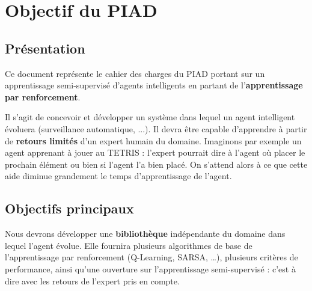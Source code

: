 \documentclass[a4paper,12pt]{article}
\begin{document}
  \begin{titlepage}
   \def\titletype{Cahier des charges}
   
  \end{titlepage}

  
  \clearpage

  \tableofcontents
  

  \clearpage
  
  \renewcommand{\labelitemi}{$\bullet$}
  \renewcommand{\labelitemii}{$\circ$}
  \renewcommand{\labelitemiii}{$\diamond$}
  \renewcommand{\labelitemiv}{$\ast$}
  
  \section{Objectif du PIAD}
  \subsection{Présentation}
    Ce document représente le cahier des charges du PIAD portant sur un apprentissage semi-supervisé d'agents intelligents 
    en partant de l'\textbf{apprentissage par renforcement}.
	  
    Il s'agit de concevoir et développer un système dans lequel un agent intelligent évoluera (surveillance automatique, ...).
    Il devra être capable d'apprendre à partir de \textbf{retours limités} d'un expert humain du domaine. 
    Imaginons par exemple un agent apprenant à jouer au TETRIS : l'expert pourrait dire à l'agent où placer le 
    prochain élément ou bien si l'agent l'a bien placé. On s'attend alors à ce que cette aide diminue grandement le temps 
    d'apprentissage de l'agent.
    
  
  \subsection{Objectifs principaux}
	Nous devrons développer une \textbf{bibliothèque} indépendante du domaine dans lequel l'agent évolue. 
	Elle fournira plusieurs algorithmes de base de l'apprentissage par renforcement  (Q-Learning, SARSA, …), 
	plusieurs critères de performance, ainsi qu'une ouverture sur l'apprentissage semi-supervisé : 
	c'est à dire avec les retours de l'expert pris en compte. 
	
\end{document}
